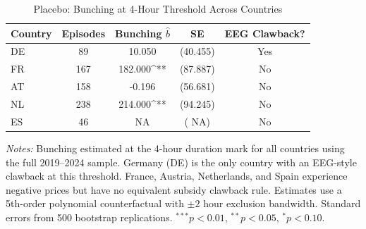 \begin{table}[t]
\centering
\caption{Placebo: Bunching at 4-Hour Threshold Across Countries}
\label{tab:placebo}
\begin{tabular}{lcccc}
\hline\hline
Country & Episodes & Bunching $\hat{b}$ & SE & EEG Clawback? \\
\hline
DE & 89 & 10.050 & (40.455) & Yes \\
FR & 167 & 182.000^{**} & (87.887) & No \\
AT & 158 & -0.196 & (56.681) & No \\
NL & 238 & 214.000^{**} & (94.245) & No \\
ES & 46 &   NA & (  NA) & No \\
\hline\hline
\end{tabular}
\begin{tablenotes}[flushleft]
\footnotesize
\item \textit{Notes:} Bunching estimated at the 4-hour duration mark for all countries using the full 2019--2024 sample. Germany (DE) is the only country with an EEG-style clawback at this threshold. France, Austria, Netherlands, and Spain experience negative prices but have no equivalent subsidy clawback rule. Estimates use a 5th-order polynomial counterfactual with $\pm 2$ hour exclusion bandwidth. Standard errors from 500 bootstrap replications. $^{***}p<0.01$, $^{**}p<0.05$, $^{*}p<0.10$.
\end{tablenotes}
\end{table}
